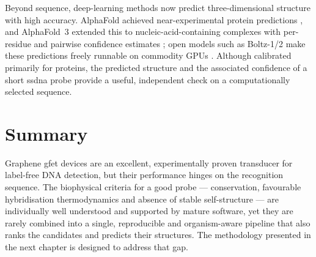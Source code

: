 Beyond sequence, deep-learning methods now predict three-dimensional structure with high accuracy.
AlphaFold achieved near-experimental protein predictions \citep{jumper2021}, and AlphaFold~3 extended
this to nucleic-acid-containing complexes with per-residue and pairwise confidence estimates
\citep{abramson2024}; open models such as Boltz-1/2 make these predictions freely runnable on commodity
GPUs \citep{wohlwend2024}. Although calibrated primarily for proteins, the predicted structure and the
associated confidence of a short \acrshort{ssdna} probe provide a useful, independent check on a
computationally selected sequence.

\section{Summary}

Graphene \acrshort{gfet} devices are an excellent, experimentally proven transducer for label-free DNA
detection, but their performance hinges on the recognition sequence. The biophysical criteria for a good
probe --- conservation, favourable hybridisation thermodynamics and absence of stable self-structure ---
are individually well understood and supported by mature software, yet they are rarely combined into a
single, reproducible and organism-aware pipeline that also ranks the candidates and predicts their
structures. The methodology presented in the next chapter is designed to address that gap.
